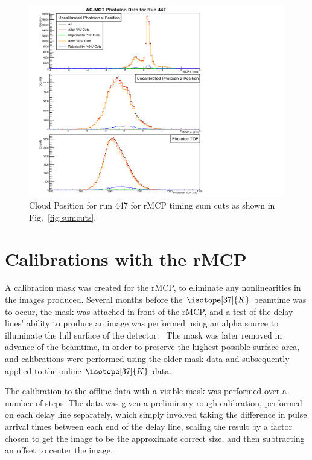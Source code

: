 \begin{figure}[h!tb]
	\centering
	\includegraphics[width=.999\linewidth]
	{Figures/rMCP_xyz_comparecuts447.pdf}
	\caption[Cloud Position for run 447 for various rMCP timing sum cuts]{Cloud Position for run 447 for rMCP timing sum cuts as shown in Fig.~\ref{fig:sumcuts}.}	
	\label{fig:position_with_sumcuts}
\end{figure}

\FloatBarrier  %
\section{Calibrations with the rMCP}
\label{sec:rmcp_cals}
A calibration mask was created for the rMCP, to eliminate any nonlinearities in the images produced.  Several months before the $\isotope[37]{K}$ beamtime was to occur, the mask was attached in front of the rMCP, and a test of the delay lines' ability to produce an image was performed using an alpha source to illuminate the full surface of the detector.~  The mask was later removed in advance of the beamtime, in order to preserve the highest possible surface area, and calibrations were performed using the older mask data and subsequently applied to the online $\isotope[37]{K}$ data.%

The calibration to the offline data with a visible mask was performed over a number of steps.  The data was given a preliminary rough calibration, performed on each delay line separately, which simply involved taking the difference in pulse arrival times between each end of the delay line, scaling the result by a factor chosen to get the image to be the approximate correct size, and then subtracting an offset to center the image.  

